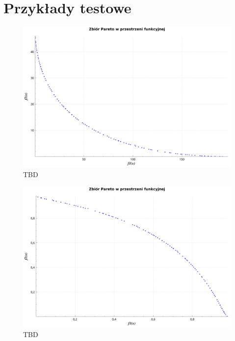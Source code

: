 \documentclass[11pt,a4paper]{article}
\begin{document}
\section{Przykłady testowe}
\begin{figure}[H]
\centering
\includegraphics[width=14cm]{binh_korn_100_100}
\caption{TBD}
\label{fig:binh_korn_100_100}
\end{figure}

\begin{figure}[H]
\centering
\includegraphics[width=14cm]{fonsec_fleming_100_100}
\caption{TBD}
\label{fig:fonsec_fleming_100_100}
\end{figure}
\end{document}
